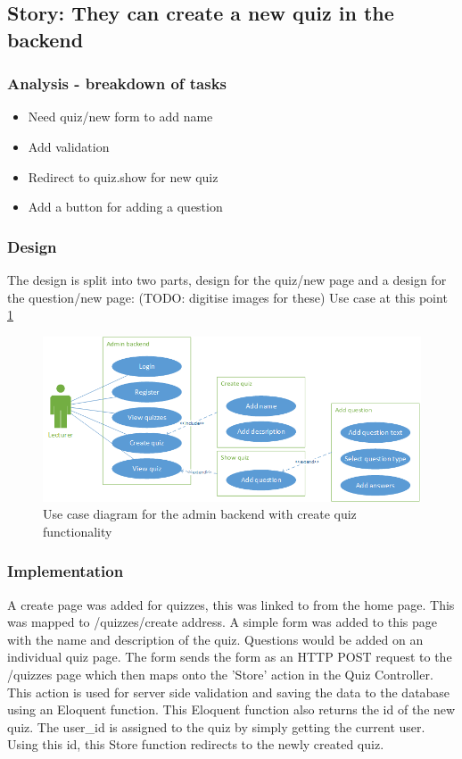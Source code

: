 \subsection{Story: They can create a new quiz in the backend}
\subsubsection{Analysis - breakdown of tasks}
\begin{itemize}
	\item Need quiz/new form to add name
	\item Add validation
	\item Redirect to quiz.show for new quiz
	\item Add a button for adding a question
\end{itemize}
\subsubsection{Design}
The design is split into two parts, design for the quiz/new page and a design for the question/new page:
(TODO: digitise images for these)
Use case at this point \ref{fig:quiz-create-use-case}
\begin{figure}
	\caption{Use case diagram for the admin backend with create quiz functionality}
	\centerline{\includegraphics{Chapter2/Iter-2/iter-2-use-case-create}}
	\label{fig:quiz-create-use-case}
\end{figure}
\subsubsection{Implementation}
A create page was added for quizzes, this was linked to from the home page. This was mapped to /quizzes/create address. A simple form was added to this page with the name and description of the quiz. Questions would be added on an individual quiz page. The form sends the form as an HTTP POST request to the /quizzes page which then maps onto the 'Store' action in the Quiz Controller. This action is used for server side validation and saving the data to the database using an Eloquent function. This Eloquent function also returns the id of the new quiz. The user\_id is assigned to the quiz by simply getting the current user. Using this id, this Store function redirects to the newly created quiz.

